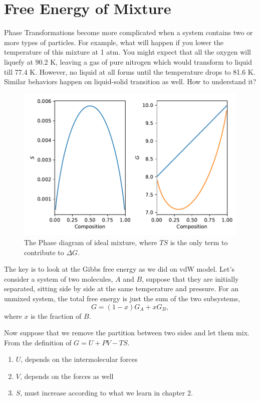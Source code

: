

\section{Free Energy of Mixture}
Phase Transformations become more complicated when a system contains two or more types of particles.
For example, what will happen if you lower the temperature of this mixture at 1 atm.
You might expect that all the oxygen will liquefy at 90.2 K, leaving a gas of pure nitrogen which 
would transform to liquid till 77.4 K. However, no liquid at all forms until the temperature drops to 81.6 K.
Similar behaviors happen on liquid-solid transition as well. How to understand it?

\begin{figure}[h]
\centering
\label{ideal-mix}
\includegraphics[width=12cm]{imgs/Ideal-Mixture.pdf}
\caption{The Phase diagram of ideal mixture, where $TS$ is the only term to contribute to $\Delta{G}$. }
\end{figure}


The key is to look at the Gibbs free energy as we did on vdW model. Let's consider a system of two molecules, $A$
and $B$, suppose that they are initially separated, sitting side by side at the same temperature and pressure. For
an unmixed system, the total free energy is just the sum of the two subsystems,
\begin{equation}
G = (1-x)G_A + xG_B,
\end{equation}
where $x$ is the fraction of $B$. 

Now suppose that we remove the partition between two sides and let them mix. From the definition of $G=U+PV-TS$.
\begin{enumerate}
\item $U$, depends on the intermolecular forces
\item $V$, depends on the forces as well
\item $S$, must increase according to what we learn in chapter 2.
\end{enumerate}

